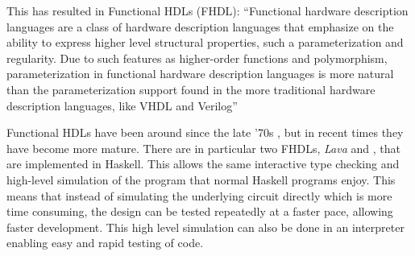		This has resulted in Functional HDLs (FHDL): ``Functional hardware
		description languages are a class of hardware description languages
		that emphasize on the ability to express higher level structural
		properties, such a parameterization and regularity. Due to such
		features as higher-order functions and polymorphism, parameterization
		in functional hardware description languages is more natural than the
		parameterization support found in the more traditional hardware
		description languages, like VHDL and Verilog'' \cite{Baaij2009}
		
		Functional HDLs have been around since the late '70s \cite{Chen2012},
		but in recent times they have become more mature. There are in
		particular two FHDLs, \emph{Lava} and \clash \cite{Baaij2009,
		Bjesse1998}, that are implemented in Haskell. This allows the same
		interactive type checking and high-level simulation of the program that
		normal Haskell programs enjoy. This means that instead of simulating
		the underlying circuit directly which is more time consuming, the
		design can be tested repeatedly at a faster pace, allowing faster 
		development. This high level simulation can also be done in an interpreter enabling easy and rapid testing of code.
